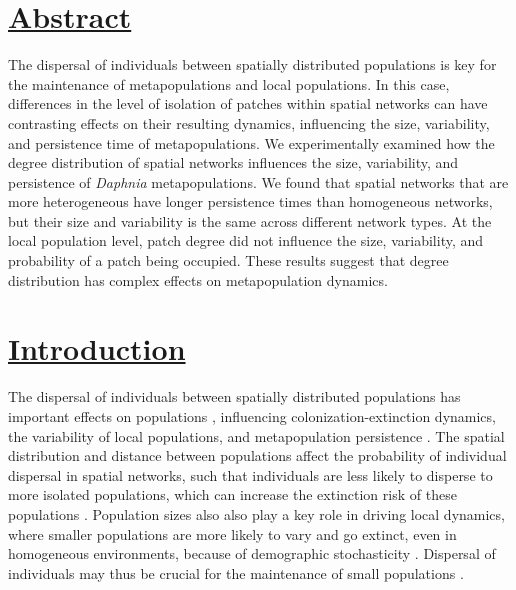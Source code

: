 
\section*{\textbf{\underline{Abstract}}}
The dispersal of individuals between spatially distributed populations is key for the maintenance of metapopulations and local populations. In this case, differences in the level of isolation of patches within spatial networks can have contrasting effects on their resulting dynamics, influencing the size, variability, and persistence time of metapopulations. We experimentally examined how the degree distribution of spatial networks influences the size, variability, and persistence of \textit{Daphnia} metapopulations. We found that spatial networks that are more heterogeneous have longer persistence times than homogeneous networks, but their size and variability is the same across different network types. At the local population level, patch degree did not influence the size, variability, and probability of a patch being occupied. These results suggest that degree distribution has complex effects on metapopulation dynamics.

\section*{\textbf{\underline{Introduction}}}

The dispersal of individuals between spatially distributed populations has important effects on populations \parencite{hanski1998, abbott2011}, influencing colonization-extinction dynamics, the variability of local populations, and metapopulation persistence \parencite{wang2015,fox2017, schmidt2020}. The spatial distribution and distance between populations affect the probability of individual dispersal in spatial networks, such that individuals are less likely to disperse to more isolated populations, which can increase the extinction risk of these populations \parencite{brown1977, schmidt2020}. Population sizes also also play a key role in driving local dynamics, where smaller populations are more likely to vary and go extinct, even in homogeneous environments, because of demographic stochasticity \parencite{hanski1998,melbourne2008}. Dispersal of individuals may thus be crucial for the maintenance of small populations \parencite{sutherland2012}.
 
